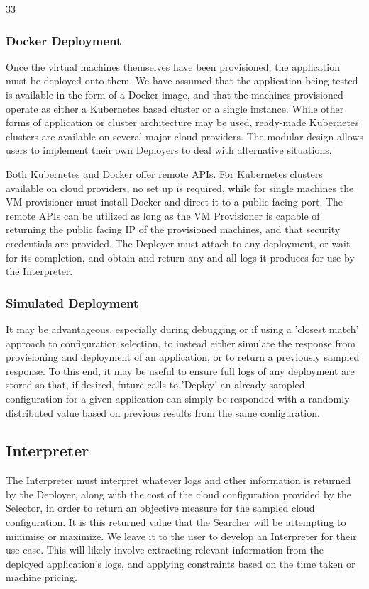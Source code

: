 33\documentclass{article}
\begin{document}
\subsubsection{Docker Deployment}
Once the virtual machines themselves have been provisioned, the application must be deployed onto them. We have assumed that the application being tested is available in the form of a Docker image, and that the machines provisioned operate as either a Kubernetes based cluster or a single instance. While other forms of application or cluster architecture may be used, ready-made Kubernetes clusters are available on several major cloud providers. The modular design allows users to implement their own Deployers to deal with alternative situations. 

Both Kubernetes and Docker offer remote APIs. For Kubernetes clusters available on cloud providers, no set up is required, while for single machines the VM provisioner must install Docker and direct it to a public-facing port. The remote APIs can be utilized as long as the VM Provisioner is capable of returning the public facing IP of the provisioned machines, and that security credentials are provided. The Deployer must attach to any deployment, or wait for its completion, and obtain and return any and all logs it produces for use by the Interpreter.

\subsubsection{Simulated Deployment}
It may be advantageous, especially during debugging or if using a 'closest match' approach to configuration selection, to instead either simulate the response from provisioning and deployment of an application, or to return a previously sampled response. To this end, it may be useful to ensure full logs of any deployment are stored so that, if desired, future calls to 'Deploy' an already sampled configuration for a given application can simply be responded with a randomly distributed value based on previous results from the same configuration.

\subsection{Interpreter}
The Interpreter must interpret whatever logs and other information is returned by the Deployer, along with the cost of the cloud configuration provided by the Selector, in order to return an objective measure for the sampled cloud configuration. It is this returned value that the Searcher will be attempting to minimise or maximize. We leave it to the user to develop an Interpreter for their use-case. This will likely involve extracting relevant information from the deployed application's logs, and applying constraints based on the time taken or machine pricing. 
\end{document}

